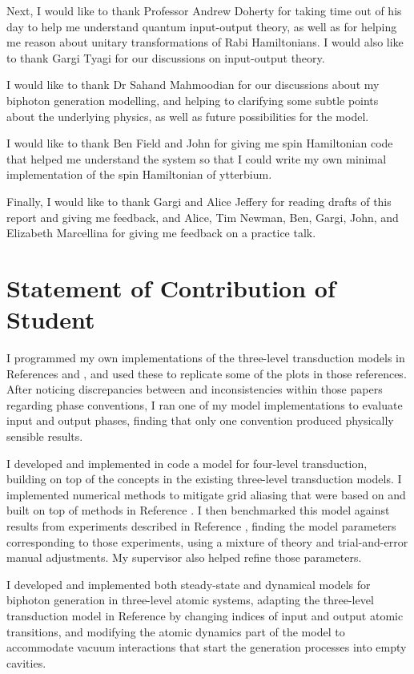 Next, I would like to thank Professor Andrew Doherty for taking time out of his day to help me understand quantum input-output theory, as well as for helping me reason about unitary transformations of Rabi Hamiltonians. I would also like to thank Gargi Tyagi for our discussions on input-output theory. 

I would like to thank Dr Sahand Mahmoodian for our discussions about my biphoton generation modelling, and helping to clarifying some subtle points about the underlying physics, as well as future possibilities for the model.

I would like to thank Ben Field and John for giving me spin Hamiltonian code that helped me understand the system so that I could write my own minimal implementation of the spin Hamiltonian of ytterbium.

Finally, I would like to thank Gargi and Alice Jeffery for reading drafts of this report and giving me feedback, and Alice, Tim Newman, Ben, Gargi, John, and Elizabeth Marcellina for giving me feedback on a practice talk.

\section*{Statement of Contribution of Student}
I programmed my own implementations of the three-level transduction models in References \cite{fernandez-gonzalvo_2019} and \cite{barnett_longdell_2020}, and used these to replicate some of the plots in those references. After noticing discrepancies between and inconsistencies within those papers regarding phase conventions, I ran one of my model implementations to evaluate input and output phases, finding that only one convention produced physically sensible results.

I developed and implemented in code a model for four-level transduction, building on top of the concepts in the existing three-level transduction models. I implemented numerical methods to mitigate grid aliasing that were based on and built on top of methods in Reference \cite{barnett_longdell_2020}. I then benchmarked this model against results from experiments described in Reference \cite{bartholomew_chip_2020}, finding the model parameters corresponding to those experiments, using a mixture of theory and trial-and-error manual adjustments. My supervisor also helped refine those parameters.

I developed and implemented both steady-state and dynamical models for biphoton generation in three-level atomic systems, adapting the three-level transduction model in Reference \cite{barnett_longdell_2020} by changing indices of input and output atomic transitions, and modifying the atomic dynamics part of the model to accommodate vacuum interactions that start the generation processes into empty cavities.
